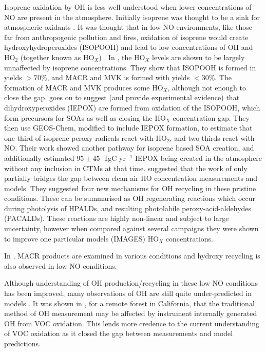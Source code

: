     Isoprene oxidation by OH is less well understood when lower concentrations of NO are present in the atmosphere.
    Initially isoprene was thought to be a sink for atmospheric oxidants \citep[e.g.][]{Guenther2000}.
    It was thought that in low NO environments, like those far from anthropogenic pollution and fires, oxidation of isoprene would create hydroxyhydroperoxides (ISOPOOH) and lead to low concentrations of OH and HO$_2$ (together known as HO$_X$) \citet{Paulot2009b}.
    In \citet{Paulot2009b}, the HO$_X$ levels are shown to be largely unnaffected by isoprene concentrations.
    They show that ISOPOOH is formed in yields $> 70\%$, and MACR and MVK is formed with yields $< 30\%$.
    The formation of MACR and MVK produces some HO$_X$, although not enough to close the gap.
    \citet{Paulot2009b} goes on to suggest (and provide experimental evidence) that dihydroxyperoxides (IEPOX) are formed from oxidation of the ISOPOOH, which form precursors for SOAs as well as closing the HO$_X$ concentration gap.
    They then use GEOS-Chem, modified to include IEPOX formation, to estimate that one third of isoprene peroxy radicals react with HO$_2$, and two thirds react with NO. 
    Their work showed another pathway for isoprene based SOA creation, and additionally estimated $95 \pm 45$~TgC yr$^{-1}$ IEPOX being created in the atmosphere without any inclusion in CTMs at that time.
    \citet{Peeters2010} suggested that the work of \citet{Paulot2009b} only partially bridges the gap between clean air HO concentration measurements and models.
    They suggested four new mechanisms for OH recycling in these pristine conditions. These can be summarised as OH regenerating reactions which occur during photolysis of HPALDs, and resulting photolabile peroxy-acid-aldehydes (PACALDs).
    These reactions are highly non-linear and subject to large uncertainty, however when compared against several campaigns they were shown to improve one particular models (IMAGES) HO$_X$ concentrations.
    
    In \cite{Crounse2012}, MACR products are examined in various conditions and hydroxy recycling is also observed in low NO conditions.
    
    Although understanding of OH production/recycling in these low NO conditions has been improved, many observations of OH are still quite under-predicted in models \citep{Mao2012}.
    It was shown in \citet{Mao2012}, for a remote forest in California, that the traditional method of OH measurement may be affected by instrument internally generated OH from VOC oxidation.
    This lends more credence to the current understanding of VOC oxidation as it closed the gap between measurements and model predictions.
    
